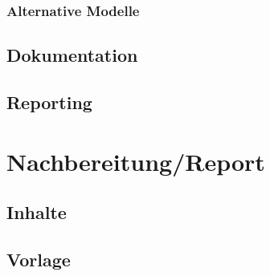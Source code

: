 			\subsubsection{Alternative Modelle}
		\subsection{Dokumentation}	            	
            	\subsection{Reporting}    	
	\section{Nachbereitung/Report}
			\subsection{Inhalte}
			\subsection{Vorlage}
